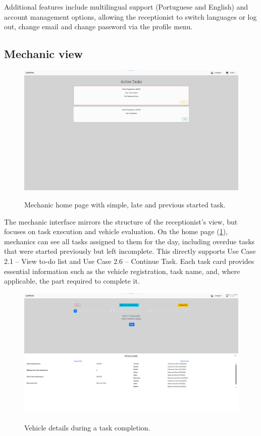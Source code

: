 Additional features include multilingual support (Portuguese and English) and account management options, allowing the receptionist to switch languages or log out, change email and change password via the profile menu.


\subsection{Mechanic view}


\begin{figure}[h]
  \caption{Mechanic home page with simple, late and previous started task.}
  \centering
  \includegraphics[width=\textwidth]{figs/Implementation/mechanic/HomeShowTasks}
  \label{fig:HomeShowTasks}
\end{figure}





The mechanic interface mirrors the structure of the receptionist's view, but focuses on task execution and vehicle evaluation. On the home page (\ref{fig:HomeShowTasks}), mechanics can see all tasks assigned to them for the day, including overdue tasks that were started previously but left incomplete. This directly supports Use Case 2.1 – View to-do list and Use Case 2.6 – Continue Task. Each task card provides essential information such as the vehicle registration, task name, and, where applicable, the part required to complete it.



\begin{figure}[h]
  \caption{Vehicle details during a task completion.}
  \centering
  \includegraphics[width=\textwidth]{figs/Implementation/mechanic/MechanicTaskVehicleDetails}
  \label{fig:MechanicTaskVehicleDetails}
\end{figure}



